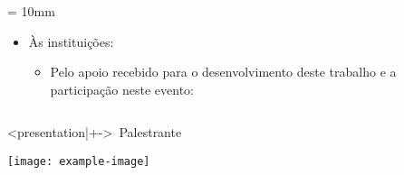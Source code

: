\documentclass[
  aspectratio = 169,%
  10pt,%
  t,%
  onlytextwidth,%
  compress,%
  xcolor = table,%
  english %
  spanish,%
]{beamer}
\begin{document}
\begin{frame}

 = 10mm%

\pause%

\begin{itemize}
\item<+->[\scriptsize\faUniversity] Às instituições:
\begin{itemize}
\item Pelo apoio recebido para o desenvolvimento deste trabalho e a participação neste evento:\par%
\begin{minipage}[c][20mm]{\linewidth}
%
\hfill%
%
\hfill%
%
\hfill%
%
\hfill%
%
\hspace*{0.2\dimen1}%
\end{minipage}
\end{itemize}
\end{itemize}

\begin{columns}[t]


\begin{exampleblock}<presentation|+->{\faTalking\ Palestrante}%

\begin{minipage}{0.75\dimen1}
\color{UTFPRYellow}
\texttt{[image: example-image]}
\end{minipage}%
\hfill%
\begin{minipage}{\linewidth-1em-0.75\dimen1}
\par%
\InfoList{\faUniversity}{\UTFPRName}\par%
\end{minipage}


\end{exampleblock}
\end{columns}
\end{frame}
\end{document}
